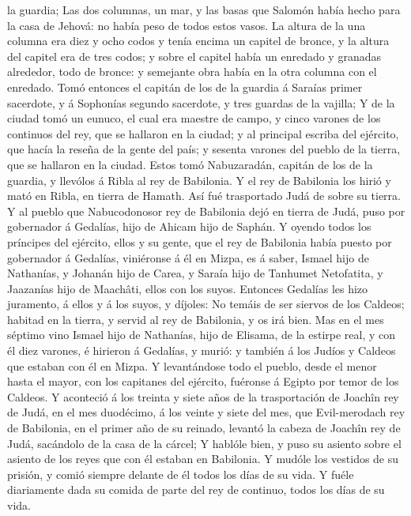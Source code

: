 la guardia;  Las dos columnas, un mar, y las basas que
Salomón había hecho para la casa de Jehová: no había peso de todos estos
vasos.  La altura de la una columna era diez y ocho codos
y tenía encima un capitel de bronce, y la altura del capitel era de tres
codos; y sobre el capitel había un enredado y granadas alrededor, todo
de bronce: y semejante obra había en la otra columna con el enredado.
 Tomó entonces el capitán de los de la guardia á Saraías
primer sacerdote, y á Sophonías segundo sacerdote, y tres guardas de la
vajilla;  Y de la ciudad tomó un eunuco, el cual era
maestre de campo, y cinco varones de los continuos del rey, que se
hallaron en la ciudad; y al principal escriba del ejército, que hacía la
reseña de la gente del país; y sesenta varones del pueblo de la tierra,
que se hallaron en la ciudad.  Estos tomó Nabuzaradán,
capitán de los de la guardia, y llevólos á Ribla al rey de Babilonia.
 Y el rey de Babilonia los hirió y mató en Ribla, en
tierra de Hamath. Así fué trasportado Judá de sobre su tierra.
 Y al pueblo que Nabucodonosor rey de Babilonia dejó en
tierra de Judá, puso por gobernador á Gedalías, hijo de Ahicam hijo de
Saphán.  Y oyendo todos los príncipes del ejército, ellos
y su gente, que el rey de Babilonia había puesto por gobernador á
Gedalías, viniéronse á él en Mizpa, es á saber, Ismael hijo de
Nathanías, y Johanán hijo de Carea, y Saraía hijo de Tanhumet
Netofatita, y Jaazanías hijo de Maachâti, ellos con los suyos.
 Entonces Gedalías les hizo juramento, á ellos y á los
suyos, y díjoles: No temáis de ser siervos de los Caldeos; habitad en la
tierra, y servid al rey de Babilonia, y os irá bien.  Mas
en el mes séptimo vino Ismael hijo de Nathanías, hijo de Elisama, de la
estirpe real, y con él diez varones, é hirieron á Gedalías, y murió: y
también á los Judíos y Caldeos que estaban con él en Mizpa.
 Y levantándose todo el pueblo, desde el menor hasta el
mayor, con los capitanes del ejército, fuéronse á Egipto por temor de
los Caldeos.  Y aconteció á los treinta y siete años de
la trasportación de Joachîn rey de Judá, en el mes duodécimo, á los
veinte y siete del mes, que Evil-merodach rey de Babilonia, en el primer
año de su reinado, levantó la cabeza de Joachîn rey de Judá, sacándolo
de la casa de la cárcel;  Y hablóle bien, y puso su
asiento sobre el asiento de los reyes que con él estaban en Babilonia.
 Y mudóle los vestidos de su prisión, y comió siempre
delante de él todos los días de su vida.  Y fuéle
diariamente dada su comida de parte del rey de continuo, todos los días
de su vida.
